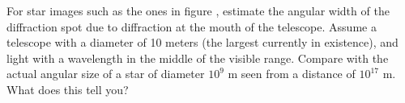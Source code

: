 For star images such as the ones in figure ,
estimate the angular width of the diffraction spot due
to diffraction at the mouth of the telescope. Assume a
telescope with a diameter of 10 meters (the largest
currently in existence), and light with a wavelength in the
middle of the visible range. Compare with the actual angular
size of a star of diameter $10^9$ m seen from a distance of
$10^{17}$ m. What does this tell you?
